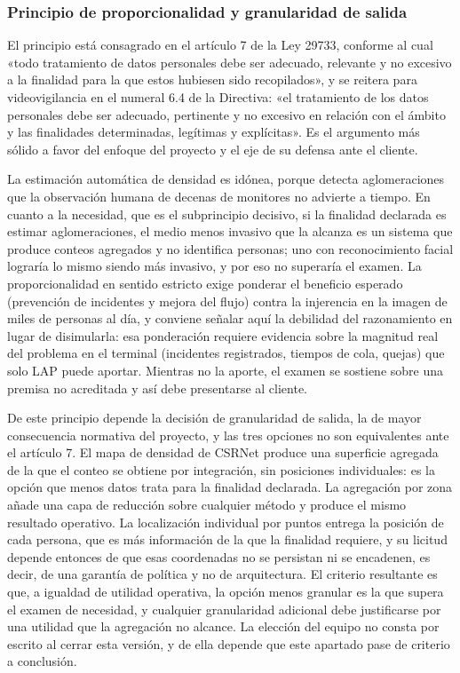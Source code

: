 \subsubsection{Principio de proporcionalidad y granularidad de salida}

El principio está consagrado en el artículo 7 de la Ley 29733, conforme
al cual «todo tratamiento de datos personales debe ser adecuado,
relevante y no excesivo a la finalidad para la que estos hubiesen sido
recopilados», y se reitera para videovigilancia en el numeral 6.4 de la
Directiva: «el tratamiento de los datos personales debe ser adecuado,
pertinente y no excesivo en relación con el ámbito y las finalidades
determinadas, legítimas y explícitas». Es el argumento más sólido a
favor del enfoque del proyecto y el eje de su defensa ante el cliente.

La estimación automática de densidad es idónea, porque detecta
aglomeraciones que la observación humana de decenas de monitores no
advierte a tiempo. En cuanto a la necesidad, que es el subprincipio
decisivo, si la finalidad declarada es estimar aglomeraciones, el medio
menos invasivo que la alcanza es un sistema que produce conteos
agregados y no identifica personas; uno con reconocimiento facial
lograría lo mismo siendo más invasivo, y por eso no superaría el examen.
La proporcionalidad en sentido estricto exige ponderar el beneficio
esperado (prevención de incidentes y mejora del flujo) contra la
injerencia en la imagen de miles de personas al día, y conviene señalar
aquí la debilidad del razonamiento en lugar de disimularla: esa
ponderación requiere evidencia sobre la magnitud real del problema en el
terminal (incidentes registrados, tiempos de cola, quejas) que solo LAP
puede aportar. Mientras no la aporte, el examen se sostiene sobre una
premisa no acreditada y así debe presentarse al cliente.

De este principio depende la decisión de granularidad de salida, la de
mayor consecuencia normativa del proyecto, y las tres opciones no son
equivalentes ante el artículo 7. El mapa de densidad de CSRNet
\cite{Li_2018_CVPR} produce una superficie agregada de la que el conteo
se obtiene por integración, sin posiciones individuales: es la opción
que menos datos trata para la finalidad declarada. La agregación por
zona añade una capa de reducción sobre cualquier método y produce el
mismo resultado operativo. La localización individual por puntos
\cite{Song_2021_ICCV,Lin_2025_CVPR} entrega la posición de cada persona,
que es más información de la que la finalidad requiere, y su licitud
depende entonces de que esas coordenadas no se persistan ni se
encadenen, es decir, de una garantía de política y no de arquitectura.
El criterio resultante es que, a igualdad de utilidad operativa, la
opción menos granular es la que supera el examen de necesidad, y
cualquier granularidad adicional debe justificarse por una utilidad que
la agregación no alcance. La elección del equipo no consta por escrito
al cerrar esta versión, y de ella depende que este apartado pase de
criterio a conclusión.

